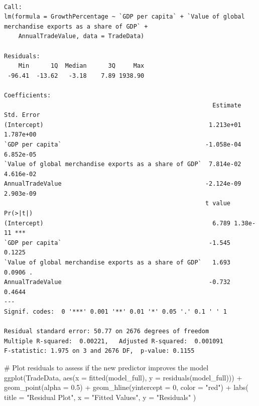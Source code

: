 \documentclass[
  10pt,
]{article}
\newenvironment{Shaded}{\begin{snugshade}}{\end{snugshade}}
\newcommand{\AttributeTok}[1]{\textcolor[rgb]{0.40,0.45,0.13}{#1}}
\newcommand{\CommentTok}[1]{\textcolor[rgb]{0.37,0.37,0.37}{#1}}
\newcommand{\DecValTok}[1]{\textcolor[rgb]{0.68,0.00,0.00}{#1}}
\newcommand{\FloatTok}[1]{\textcolor[rgb]{0.68,0.00,0.00}{#1}}
\newcommand{\FunctionTok}[1]{\textcolor[rgb]{0.28,0.35,0.67}{#1}}
\newcommand{\NormalTok}[1]{\textcolor[rgb]{0.00,0.23,0.31}{#1}}
\newcommand{\SpecialCharTok}[1]{\textcolor[rgb]{0.37,0.37,0.37}{#1}}
\newcommand{\StringTok}[1]{\textcolor[rgb]{0.13,0.47,0.30}{#1}}
\begin{document}
\begin{verbatim}

Call:
lm(formula = GrowthPercentage ~ `GDP per capita` + `Value of global merchandise exports as a share of GDP` + 
    AnnualTradeValue, data = TradeData)

Residuals:
    Min      1Q  Median      3Q     Max 
 -96.41  -13.62   -3.18    7.89 1938.90 

Coefficients:
                                                          Estimate Std. Error
(Intercept)                                              1.213e+01  1.787e+00
`GDP per capita`                                        -1.058e-04  6.852e-05
`Value of global merchandise exports as a share of GDP`  7.814e-02  4.616e-02
AnnualTradeValue                                        -2.124e-09  2.903e-09
                                                        t value Pr(>|t|)    
(Intercept)                                               6.789 1.38e-11 ***
`GDP per capita`                                         -1.545   0.1225    
`Value of global merchandise exports as a share of GDP`   1.693   0.0906 .  
AnnualTradeValue                                         -0.732   0.4644    
---
Signif. codes:  0 '***' 0.001 '**' 0.01 '*' 0.05 '.' 0.1 ' ' 1

Residual standard error: 50.77 on 2676 degrees of freedom
Multiple R-squared:  0.00221,   Adjusted R-squared:  0.001091 
F-statistic: 1.975 on 3 and 2676 DF,  p-value: 0.1155
\end{verbatim}

\begin{Shaded}
\begin{Highlighting}[]
\CommentTok{\# Plot residuals to assess if the new predictor improves the model}
\FunctionTok{ggplot}\NormalTok{(TradeData, }\FunctionTok{aes}\NormalTok{(}\AttributeTok{x =} \FunctionTok{fitted}\NormalTok{(model\_full), }\AttributeTok{y =} \FunctionTok{residuals}\NormalTok{(model\_full))) }\SpecialCharTok{+}
  \FunctionTok{geom\_point}\NormalTok{(}\AttributeTok{alpha =} \FloatTok{0.5}\NormalTok{) }\SpecialCharTok{+}
  \FunctionTok{geom\_hline}\NormalTok{(}\AttributeTok{yintercept =} \DecValTok{0}\NormalTok{, }\AttributeTok{color =} \StringTok{"red"}\NormalTok{) }\SpecialCharTok{+}
  \FunctionTok{labs}\NormalTok{(}
    \AttributeTok{title =} \StringTok{"Residual Plot"}\NormalTok{,}
    \AttributeTok{x =} \StringTok{"Fitted Values"}\NormalTok{,}
    \AttributeTok{y =} \StringTok{"Residuals"}
\NormalTok{  )}
\end{Highlighting}
\end{Shaded}
\end{document}
